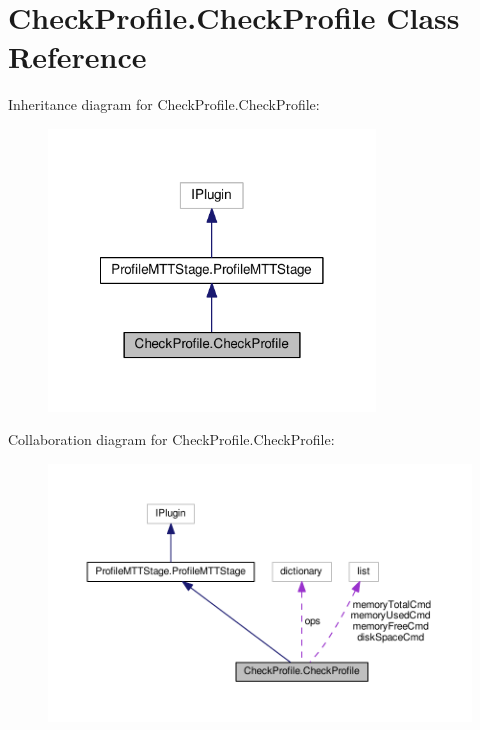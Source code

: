 \hypertarget{classCheckProfile_1_1CheckProfile}{\section{Check\-Profile.\-Check\-Profile Class Reference}
\label{classCheckProfile_1_1CheckProfile}
}


Inheritance diagram for Check\-Profile.\-Check\-Profile\-:
\nopagebreak
\begin{figure}[H]
\begin{center}
\leavevmode
\includegraphics[width=246pt]{classCheckProfile_1_1CheckProfile__inherit__graph}
\end{center}
\end{figure}


Collaboration diagram for Check\-Profile.\-Check\-Profile\-:
\nopagebreak
\begin{figure}[H]
\begin{center}
\leavevmode
\includegraphics[width=350pt]{classCheckProfile_1_1CheckProfile__coll__graph}
\end{center}
\end{figure}
